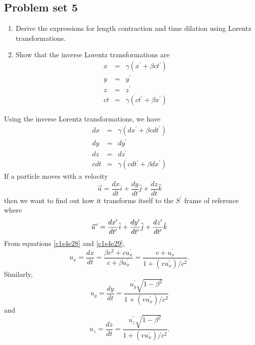 \subsection{Problem set 5}
\begin{enumerate}
\item Derive the expressions for length contraction and time dilation using
Lorentz transformations.
\item Show that the inverse Lorentz transformations are
\begin{eqnarray}
x &=& \gamma(x^\prime + \beta ct^\prime) \label{c1s4e24} \\
y &=& y^\prime \label{c1s4e25} \\
z &=& z^\prime \label{c1s4e26} \\
ct &=& \gamma(ct^\prime + \beta x^\prime) \label{c1s4e27}
\end{eqnarray}
\end{enumerate}

Using the inverse Lorentz transformations, we have
\begin{eqnarray}
dx &=& \gamma(dx^\prime + \beta cdt^\prime) \label{c1s4e28} \\
dy &=& dy^\prime \\
dz &=& dz^\prime \\
cdt &=& \gamma(cdt^\prime + \beta dx^\prime) \label{c1s4e29}
\end{eqnarray}
If a particle moves with a velocity
\[
\vec{u} = \frac{dx}{dt}\hat{i} + \frac{dy}{dt}\hat{j} + \frac{dz}{dt}\hat{k}
\]
then we want to find out how it transforms itself to the $S^\prime$ frame of 
reference where
\[
\pvec{u}^\prime = \frac{dx^\prime}{dt^\prime}\hat{i} + 
\frac{dy^\prime}{dt^\prime}\hat{j} + \frac{dz^\prime}{dt^\prime}\hat{k}
\]
From equations \eqref{c1s4e28} and \eqref{c1s4e29},
\begin{equation}\label{c1s4e30}
u_x = \frac{dx}{dt} = \frac{\beta c^2 + cu_x^\prime}{c + \beta u_x^\prime}
= \frac{v + u_x^\prime}{1 + (vu_x^\prime)/c^2}.
\end{equation} 
Similarly,
\begin{equation}\label{c1s4e31}
u_y=\frac{dy}{dt} = \frac{u_y^\prime \sqrt{1 - \beta^2}}{1 + (vu_x^\prime)/c^2}
\end{equation}
and
\begin{equation}\label{c1s4e32}
u_z=\frac{dz}{dt} = \frac{u_z^\prime \sqrt{1 - \beta^2}}{1 + (vu_x^\prime)/c^2}.
\end{equation}

